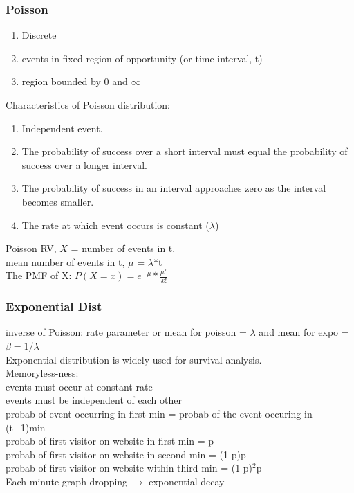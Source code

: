 \documentclass{beamer}
\begin{document}
\begin{frame}\frametitle{Poisson}
\begin{enumerate}
\item Discrete
\item events in fixed region of opportunity (or time interval, t)
\item region bounded by 0 and $\infty$
\end{enumerate}
Characteristics of Poisson distribution:
\begin{enumerate}
\item Independent event.
\item The probability of success over a short interval must equal the probability of success over a longer interval.
\item The probability of success in an interval approaches zero as the interval becomes smaller.
\item The rate at which event occurs is constant ($\lambda$)
\end{enumerate}	

Poisson RV, $X$ = number of events in t.\\
mean number of events in t, $\mu$ = $\lambda$*t\\
The PMF of X: 	$P(X=x)=e^{-\mu}*\frac{\mu^x}{x!}$
\end{frame}


\begin{frame}\frametitle{Exponential Dist}
inverse of Poisson: rate parameter or mean for poisson = $\lambda$ and mean for expo = $\beta=1/\lambda$ \\
Exponential distribution is widely used for survival analysis.\\
Memoryless-ness:\\
events must occur at constant rate\\
events must be independent of each other\\
probab of event occurring in first min = probab of the event occuring in (t+1)min\\
probab of first visitor on website in first min = p\\
probab of first visitor on website in second min = (1-p)p\\
probab of first visitor on website within third min = (1-p)$^2$p\\
Each minute graph dropping $\rightarrow$ exponential decay


\end{frame}
\end{document}
